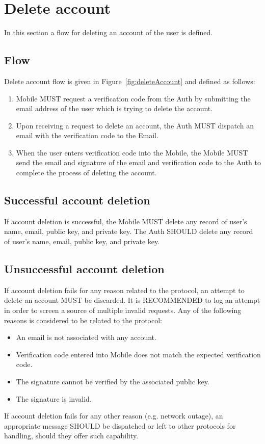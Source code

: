 \section{Delete account}
In this section a flow for deleting an account of the user is defined. 

    \subsection{Flow}
    Delete account flow is given in Figure~\ref{fig:deleteAccount} and defined as follows:
        \begin{enumerate}
            \item Mobile MUST request a verification code from the Auth by submitting the email address of the user
                  which is trying to delete the account.
            \item Upon receiving a request to delete an account, the Auth MUST dispatch an email with the verification
                  code to the Email.
            \item When the user enters verification code into the Mobile, the Mobile MUST send the email and signature 
                  of the email and verification code to the Auth to complete the process of deleting the account.
        \end{enumerate}
        
    
    \subsection{Successful account deletion}
    If account deletion is successful, the Mobile MUST delete any record of user's name, email, public key, and 
    private key. The Auth SHOULD delete any record of user's name, email, public key, and private key.

    \subsection{Unsuccessful account deletion}
    If account deletion fails for any reason related to the protocol, an attempt to delete an account MUST be discarded. 
    It is RECOMMENDED to log an attempt in order to screen a source of multiple invalid requests. Any of the following 
    reasons is considered to be related to the protocol:
        \begin{itemize}
            \item An email is not associated with any account.
            \item Verification code entered into Mobile does not match the expected verification code.
            \item The signature cannot be verified by the associated public key.
            \item The signature is invalid.
        \end{itemize}
    If account deletion fails for any other reason (e.g. network outage), an appropriate message SHOULD be dispatched or 
    left to other protocols for handling, should they offer such capability.
